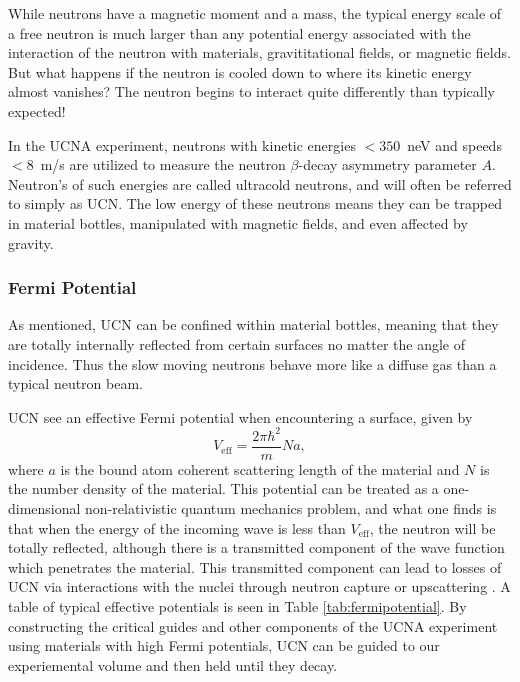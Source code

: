 While neutrons have a magnetic moment and a mass, the typical energy scale
of a free neutron is much larger than any potential energy associated with
the interaction of the neutron with materials, gravititational fields,
or magnetic fields. But what happens if the neutron is cooled down
to where its kinetic energy almost vanishes? The neutron begins to interact
quite differently than typically expected!

In the UCNA experiment, neutrons
with kinetic energies $<350$~neV and speeds $<8$~m/s are utilized to measure
the neutron $\beta$-decay asymmetry parameter $A$. Neutron's of such energies
are called ultracold neutrons, and will often be referred to simply as UCN. The
low energy of these neutrons means they can be trapped in material bottles, manipulated
with magnetic fields, and even affected by gravity.

\subsubsection{Fermi Potential} \label{sssec:fermipotential}

As mentioned, UCN can be confined within material bottles, meaning that they are
totally internally reflected from certain surfaces no matter the angle of incidence.
Thus the slow moving neutrons behave more like a diffuse gas than a typical neutron
beam.

UCN see an effective Fermi potential when encountering a surface, given by
%
\begin{equation}
  V_{\mathrm{eff}} = \frac{2\pi\hbar^2}{m}Na,
\end{equation}
where $a$ is the bound atom coherent scattering length of the material and $N$ is the number density of
the material. This potential can be treated as a one-dimensional non-relativistic quantum mechanics problem,
and what one finds is that when the energy of the incoming wave is less than $V_{\mathrm{eff}}$, the neutron will be
totally reflected, although there is a transmitted component of the wave function which penetrates the
material. This transmitted component can lead to losses of UCN via interactions with the nuclei through
neutron capture or upscattering \cite{golub1991ultra}. A table of typical effective potentials is seen
in Table \ref{tab:fermipotential}.
By constructing the critical guides and other components of the UCNA experiment using materials with high
Fermi potentials, UCN can be guided to our experiemental volume and then held until they decay.

